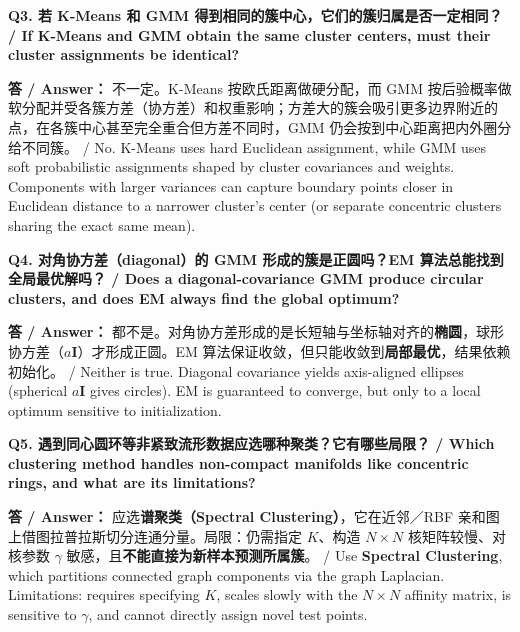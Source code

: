 \textbf{Q3. 若 K-Means 和 GMM 得到相同的簇中心，它们的簇归属是否一定相同？ / If K-Means and GMM obtain the same cluster centers, must their cluster assignments be identical?}

\textbf{答 / Answer：} 不一定。K-Means 按欧氏距离做硬分配，而 GMM 按后验概率做软分配并受各簇方差（协方差）和权重影响；方差大的簇会吸引更多边界附近的点，在各簇中心甚至完全重合但方差不同时，GMM 仍会按到中心距离把内外圈分给不同簇。 / No. K-Means uses hard Euclidean assignment, while GMM uses soft probabilistic assignments shaped by cluster covariances and weights. Components with larger variances can capture boundary points closer in Euclidean distance to a narrower cluster's center (or separate concentric clusters sharing the exact same mean).

\textbf{Q4. 对角协方差（diagonal）的 GMM 形成的簇是正圆吗？EM 算法总能找到全局最优解吗？ / Does a diagonal-covariance GMM produce circular clusters, and does EM always find the global optimum?}

\textbf{答 / Answer：} 都不是。对角协方差形成的是长短轴与坐标轴对齐的\textbf{椭圆}，球形协方差（$a\mathbf{I}$）才形成正圆。EM 算法保证收敛，但只能收敛到\textbf{局部最优}，结果依赖初始化。 / Neither is true. Diagonal covariance yields axis-aligned ellipses (spherical $a\mathbf{I}$ gives circles). EM is guaranteed to converge, but only to a local optimum sensitive to initialization.

\textbf{Q5. 遇到同心圆环等非紧致流形数据应选哪种聚类？它有哪些局限？ / Which clustering method handles non-compact manifolds like concentric rings, and what are its limitations?}

\textbf{答 / Answer：} 应选\textbf{谱聚类（Spectral Clustering）}，它在近邻／RBF 亲和图上借图拉普拉斯切分连通分量。局限：仍需指定 $K$、构造 $N\times N$ 核矩阵较慢、对核参数 $\gamma$ 敏感，且\textbf{不能直接为新样本预测所属簇}。 / Use \textbf{Spectral Clustering}, which partitions connected graph components via the graph Laplacian. Limitations: requires specifying $K$, scales slowly with the $N\times N$ affinity matrix, is sensitive to $\gamma$, and cannot directly assign novel test points.



